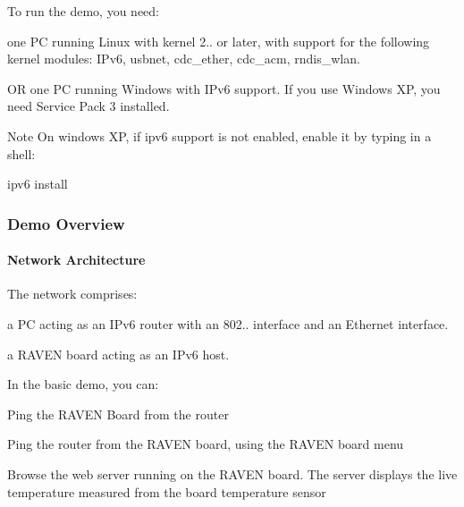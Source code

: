 \-To run the demo, you need\-: \begin{DoxyItemize}
\item one \-P\-C running \-Linux with kernel 2.. or later, with support for the following kernel modules\-: \-I\-Pv6, usbnet, cdc\-\_\-ether, cdc\-\_\-acm, rndis\-\_\-wlan. \item \-O\-R one \-P\-C running \-Windows with \-I\-Pv6 support. \-If you use \-Windows \-X\-P, you need \-Service \-Pack 3 installed.\end{DoxyItemize}
\begin{DoxyNote}{\-Note}
\-On windows \-X\-P, if ipv6 support is not enabled, enable it by typing in a shell\-: \begin{DoxyVerb}
ipv6 install
\end{DoxyVerb}

\end{DoxyNote}


 \hypertarget{a00058_overview}{}\subsubsection{\-Demo Overview}\label{a00058_overview}
\hypertarget{a00058_overview_architecture}{}\paragraph{\-Network Architecture}\label{a00058_overview_architecture}
\-The network comprises\-: \begin{DoxyItemize}
\item a \-P\-C acting as an \-I\-Pv6 router with an 802.. interface and an \-Ethernet interface. \item a \-R\-A\-V\-E\-N board acting as an \-I\-Pv6 host.\end{DoxyItemize}
\-In the basic demo, you can\-: \begin{DoxyItemize}
\item \-Ping the \-R\-A\-V\-E\-N \-Board from the router \item \-Ping the router from the \-R\-A\-V\-E\-N board, using the \-R\-A\-V\-E\-N board menu \item \-Browse the web server running on the \-R\-A\-V\-E\-N board. \-The server displays the live temperature measured from the board temperature sensor\end{DoxyItemize}
 

